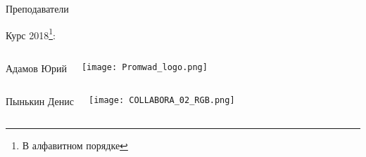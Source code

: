 
\begin{frame}{Преподаватели}

    \Large{Курс 2018\footnote{В алфавитном порядке}}:

    \begin{columns}
        Адамов Юрий
        \begin{center}
            \texttt{[image: Promwad\_logo.png]}
        \end{center}
    \end{columns}

    \begin{columns}
        Пынькин Денис
        \begin{center}
            \texttt{[image: COLLABORA\_02\_RGB.png]}
        \end{center}
    \end{columns}
\end{frame}
